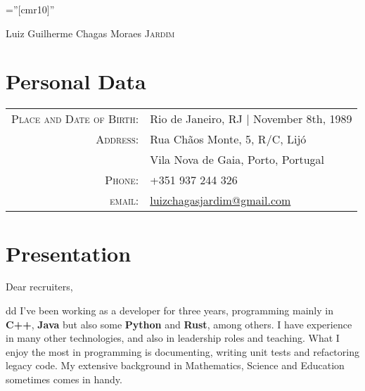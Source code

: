 \documentclass[a4paper,10pt]{article}
\newcommand{\cvtype}{d}
\begin{document}

\pagestyle{empty} %

\font\fb=''[cmr10]'' %

\par{\centering
		{\Huge Luiz Guilherme Chagas Moraes \textsc{Jardim}
	}\bigskip\par}

\section{Personal Data}

\begin{tabular}{rl}
    \textsc{Place and Date of Birth:} & Rio de Janeiro, RJ  | November 8th, 1989 \\
    \textsc{Address:}   & Rua Chãos Monte, 5, R/C, Lijó\\& Vila Nova de Gaia, Porto, Portugal \\
    \textsc{Phone:}     & +351 937 244 326\\
    \textsc{email:}     & \href{mailto:luizchagasjardim@gmail.com}{luizchagasjardim@gmail.com} \\
\end{tabular}

\section{Presentation}
Dear recruiters,

\if \cvtype d
{\quad}I've been working as a developer for three years, programming mainly in \textbf{C++}, \textbf{Java} but also some \textbf{Python} and \textbf{Rust}, among others. I have experience in many other technologies, and also in leadership roles and teaching. What I enjoy the most in programming is documenting, writing unit tests and refactoring legacy code. My extensive background in Mathematics, Science and Education sometimes comes in handy.
\end{document}
